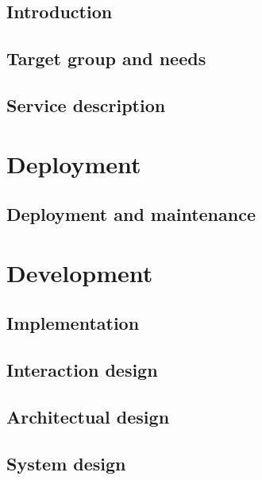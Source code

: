 \frontmatter
\chapter{Introduction}


\chapter{Target group and needs}


\chapter{Service description}


\mainmatter
\part{Deployment}

\chapter{Deployment and maintenance}


\part{Development}

\chapter{Implementation}


\chapter{Interaction design}


\chapter{Architectual design}


\chapter{System design}




%

%


\backmatter


